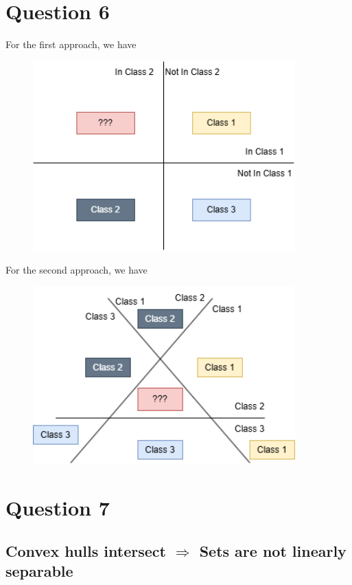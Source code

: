 \documentclass[a4paper,12pt]{article}
\begin{document}
\newpage
\section*{Question 6}

For the first approach, we have
\begin{figure}[H]
	\centering
	\includegraphics[width=0.9\textwidth]{figure/Question6.1.drawio.png}
\end{figure}

For the second approach, we have
\begin{figure}[H]
	\centering
	\includegraphics[width=0.9\textwidth]{figure/Question6.2.drawio.png}
\end{figure}

\section*{Question 7}

\subsection*{Convex hulls intersect $\Rightarrow$ Sets are not linearly separable}
\end{document}
